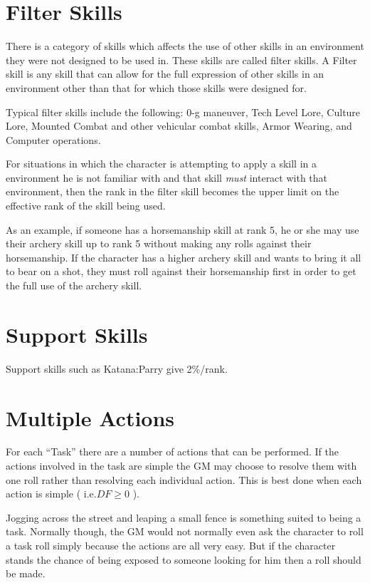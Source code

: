 \section{Filter Skills}

There is a category of skills which affects the use of other skills 
in an environment they were not designed to be used in. These skills 
are called filter skills. A Filter skill is any skill that can allow 
for the full expression of other skills in an environment other than 
that for which those skills were designed for.

Typical filter skills include the following: 0-g maneuver, Tech 
Level Lore, Culture Lore, Mounted Combat and other vehicular combat 
skills, Armor Wearing, and Computer operations.

For situations in which the character is attempting to apply a skill 
in a environment he is not familiar with and that skill {\em must }
interact with that environment, then the rank in the filter skill 
becomes the upper limit on the effective rank of the skill being 
used.

As an example, if someone has a horsemanship skill at rank 5, he or she
may use their archery skill up to rank 5 without making any rolls
against their horsemanship. If the character has a higher archery skill
and wants to bring it all to bear on a shot, they must roll against
their horsemanship first in order to get the full use of the archery
skill.

\section{Support Skills}

Support skills such as Katana:Parry give 2\%/rank.

\section{Multiple Actions}

For each ``Task'' there are a number of actions that can be performed. 
If the actions involved in the task are simple the GM may choose to
resolve  them with one roll rather than resolving each individual
action. This is best done when each action is simple ( i.e.\(  DF \geq
0\) ). 

Jogging across the street and leaping a small fence is something suited
to being a task. Normally though, the GM would not normally even ask
the character to roll a task roll simply because the actions are all
very easy. But if the character stands the chance of being exposed to
someone looking for him then a roll should be made. 

